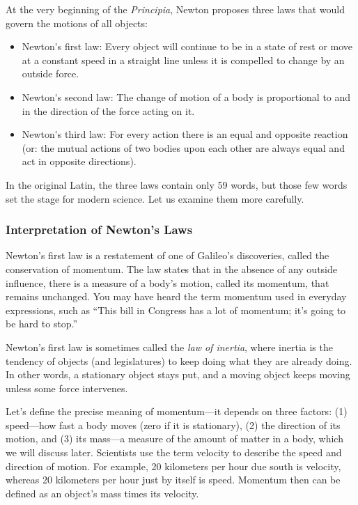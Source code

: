 \documentclass[../../main-astronomy.tex]{subfiles}
\begin{document}
\vspace{1em}

At the very beginning of the \textit{Principia}, Newton proposes three laws that would govern the motions of all objects:

\begin{itemize}
    \item \gls{Newton's first law}: Every object will continue to be in a state of rest or move at a constant speed in a straight line unless it is compelled to change by an outside force.
    \item \gls{Newton's second law}: The change of motion of a body is proportional to and in the direction of the force acting on it.
    \item \gls{Newton's third law}: For every action there is an equal and opposite reaction (or: the mutual actions of two bodies upon each other are always equal and act in opposite directions).
\end{itemize}

In the original Latin, the three laws contain only 59 words, but those few words set the stage for modern science. Let us examine them more carefully.

\subsubsection*{Interpretation of Newton's Laws}

Newton’s first law is a restatement of one of Galileo’s discoveries, called the conservation of momentum. The law states that in the absence of any outside influence, there is a measure of a body’s motion, called its \gls{momentum}, that remains unchanged. You may have heard the term momentum used in everyday expressions, such as ``This bill in Congress has a lot of momentum; it’s going to be hard to stop.''

\vspace{1em}

Newton’s first law is sometimes called the \textit{law of inertia}, where inertia is the tendency of objects (and legislatures) to keep doing what they are already doing. In other words, a stationary object stays put, and a moving object keeps moving unless some force intervenes.

\vspace{1em}

Let’s define the precise meaning of momentum---it depends on three factors: (1) speed---how fast a body moves (zero if it is stationary), (2) the direction of its motion, and (3) its mass---a measure of the amount of matter in a body, which we will discuss later. Scientists use the term \gls{velocity} to describe the speed and direction of motion. For example, 20 kilometers per hour due south is velocity, whereas 20 kilometers per hour just by itself is speed. Momentum then can be defined as an object’s mass times its velocity.
\end{document}
